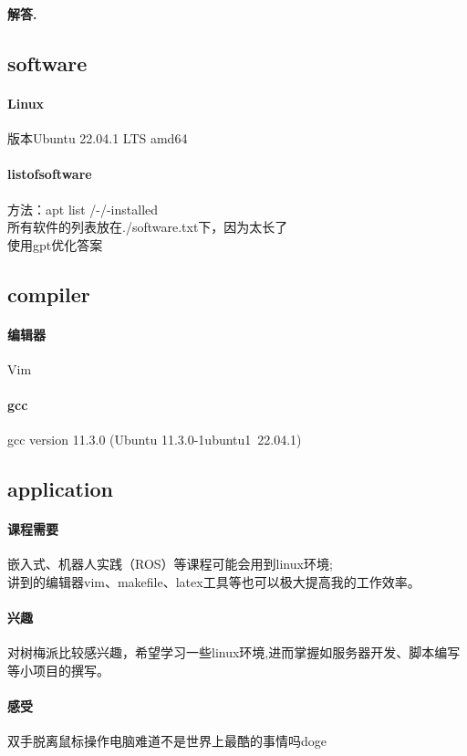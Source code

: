\documentclass[12pt, a4paper, oneside]{ctexart}
\newenvironment{solution}{\par\noindent\textbf{解答. }}{\\\par}
\begin{document}
\begin{solution}
	\subsection{software}
		\paragraph{Linux}
			版本Ubuntu 22.04.1 LTS amd64
		\paragraph{listofsoftware}
			方法：apt list /-/-installed\\
			所有软件的列表放在./software.txt下，因为太长了\\

			使用gpt优化答案\\



	\subsection{compiler}
		\paragraph{编辑器}
			Vim\\
		\paragraph{gcc}
			gcc version 11.3.0 (Ubuntu 11.3.0-1ubuntu1~22.04.1)\\
		
	\subsection{application}
		\paragraph{课程需要}
	嵌入式、机器人实践（ROS）等课程可能会用到linux环境;\\
	讲到的编辑器vim、makefile、latex工具等也可以极大提高我的工作效率。\\
		\paragraph{兴趣}
			对树梅派比较感兴趣，希望学习一些linux环境,进而掌握如服务器开发、脚本编写等小项目的撰写。\\
		\paragraph{感受}
			双手脱离鼠标操作电脑难道不是世界上最酷的事情吗doge\\
\end{solution}
\end{document}
